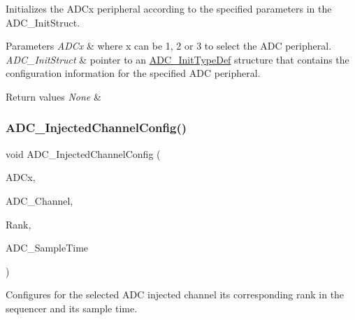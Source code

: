 Initializes the A\+D\+Cx peripheral according to the specified parameters in the A\+D\+C\+\_\+\+Init\+Struct. 


\begin{DoxyParams}{Parameters}
{\em A\+D\+Cx} & where x can be 1, 2 or 3 to select the A\+DC peripheral. \\
\hline
{\em A\+D\+C\+\_\+\+Init\+Struct} & pointer to an \mbox{\hyperlink{struct_a_d_c___init_type_def}{A\+D\+C\+\_\+\+Init\+Type\+Def}} structure that contains the configuration information for the specified A\+DC peripheral. \\
\hline
\end{DoxyParams}

\begin{DoxyRetVals}{Return values}
{\em None} & \\
\hline
\end{DoxyRetVals}
\mbox{\label{group___a_d_c___exported___functions_gae2b44bff080184e1cf6f2cb6b9bb3e59}} 
\subsubsection{\texorpdfstring{ADC\_InjectedChannelConfig()}{ADC\_InjectedChannelConfig()}}
{\footnotesize\ttfamily void A\+D\+C\+\_\+\+Injected\+Channel\+Config (\begin{DoxyParamCaption}\item[{\mbox{\hyperlink{struct_a_d_c___type_def}{A\+D\+C\+\_\+\+Type\+Def}} $\ast$}]{A\+D\+Cx,  }\item[{uint8\+\_\+t}]{A\+D\+C\+\_\+\+Channel,  }\item[{uint8\+\_\+t}]{Rank,  }\item[{uint8\+\_\+t}]{A\+D\+C\+\_\+\+Sample\+Time }\end{DoxyParamCaption})}



Configures for the selected A\+DC injected channel its corresponding rank in the sequencer and its sample time. 


